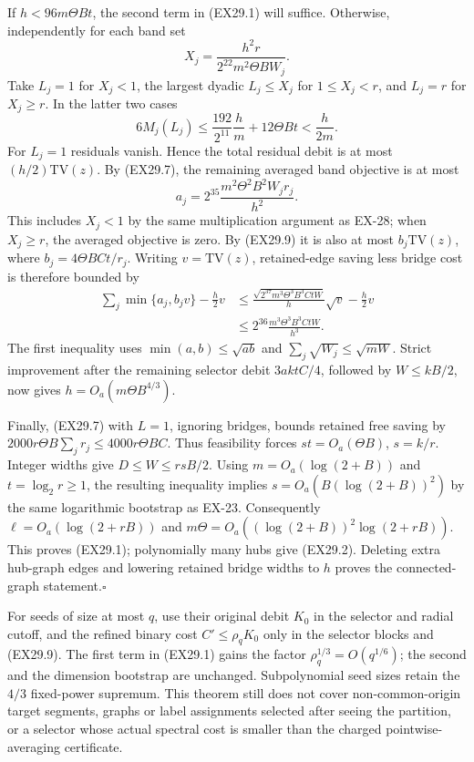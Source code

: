 If $h<96m\Theta Bt$, the second term in (EX29.1)
will suffice. Otherwise, independently for each band set
\[
 X_j=\frac{h^2r}{2^{22}m^2\Theta BW_j}.
\]
Take $L_j=1$ for $X_j<1$, the largest dyadic
$L_j\le X_j$ for $1\le X_j<r$, and $L_j=r$
for $X_j\ge r$. In the latter two cases
\[
 6M_j(L_j)\le\frac{192}{2^{11}}\frac hm
                 +12\Theta Bt<\frac h{2m}.
\]
For $L_j=1$ residuals vanish. Hence the total residual
debit is at most $(h/2)\mathrm{TV}(z)$.
By (EX29.7), the remaining averaged band objective is at most
\[
 a_j=2^{35}\frac{m^2\Theta^2B^2W_jr_j}{h^2}.
\]
This includes $X_j<1$ by the same multiplication argument
as EX-28; when $X_j\ge r$, the averaged objective is zero.
By (EX29.9) it is also at most $b_j\mathrm{TV}(z)$,
where $b_j=4\Theta BCt/r_j$.
Writing $v=\mathrm{TV}(z)$, retained-edge saving less
bridge cost is therefore bounded by
\begin{align*}
 \sum_j\min\{a_j,b_jv\}-\tfrac h2v
 &\le \frac{\sqrt{2^{37}m^3\Theta^3B^3CtW}}h\sqrt v
                   -\tfrac h2v\\
 &\le 2^{36}\frac{m^3\Theta^3B^3CtW}{h^3}.
 \tag{EX29.10}
\end{align*}
The first inequality uses $\min(a,b)\le\sqrt{ab}$ and
$\sum_j\sqrt{W_j}\le\sqrt{mW}$. Strict improvement
after the remaining selector debit $3aktC/4$, followed by
$W\le kB/2$, now gives
$h=O_a(m\Theta B^{4/3})$.

Finally, (EX29.7) with $L=1$, ignoring bridges, bounds
retained free saving by
$2000r\Theta B\sum_jr_j\le4000r\Theta BC$.
Thus feasibility forces $st=O_a(\Theta B)$, $s=k/r$.
Integer widths give $D\le W\le rsB/2$.
Using $m=O_a(\log(2+B))$ and $t=\log_2r\ge1$,
the resulting inequality implies
$s=O_a(B(\log(2+B))^2)$ by the same logarithmic
bootstrap as EX-23. Consequently
$\ell=O_a(\log(2+rB))$ and
$m\Theta=O_a((\log(2+B))^2\log(2+rB))$.
This proves (EX29.1); polynomially many hubs give
(EX29.2). Deleting extra hub-graph edges and lowering
retained bridge widths to $h$ proves the connected-graph
statement.\hfill$\square$

For seeds of size at most $q$, use their original debit $K_0$
in the selector and radial cutoff, and the refined binary cost
$C'\le\rho_qK_0$ only in the selector blocks and (EX29.9).
The first term in (EX29.1) gains the factor
$\rho_q^{1/3}=O(q^{1/6})$; the second and the dimension
bootstrap are unchanged. Subpolynomial seed sizes retain
the $4/3$ fixed-power supremum. This theorem still does not
cover non-common-origin target segments, graphs or label
assignments selected after seeing the partition, or a selector
whose actual spectral cost is smaller than the charged
pointwise-averaging certificate.

